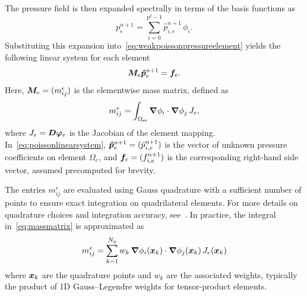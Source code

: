 \documentclass[../main.tex]{subfiles}
\begin{document}
The pressure field is then expanded spectrally in terms of the basis functions as
\begin{equation}
p_e^{n+1} = \sum_{i=0}^{p^2-1} \hat{p}_{i,e}^{n+1} \, \phi_i .
\end{equation}
Substituting this expansion into~\eqref{eq:weakpoissonpressureelement} yields the following linear system for each element
\begin{equation}
	\bm{M}_e \bm{\hat{p}}_e^{n+1} = \bm{f}_e.
	\label{eq:poissonlinearsystem}
\end{equation}
Here, $\bm{M}_e = (m_{ij}^e)$ is the elementwise mass matrix, defined as
\begin{equation}
	m_{ij}^e = \int_{\Omega_\text{st}} \grad \phi_{i} \cdot \grad \phi_{j} \, J_e,
	\label{eq:massmatrix}
\end{equation}
where $J_e = \bm{D\varphi}_e$ is the Jacobian of the element mapping. In~\eqref{eq:poissonlinearsystem}, $\bm{\hat{p}}_e^{n+1} = (\hat{p}_{i,e}^{n+1})$ is the vector of unknown pressure coefficients on element $\Omega_e$, and $\bm{f}_e = (f_{i,e}^{n+1})$ is the corresponding right-hand side vector, assumed precomputed for brevity.

The entries $m_{ij}^e$ are evaluated using Gauss quadrature with a sufficient number of points to ensure exact integration on quadrilateral elements. For more details on quadrature choices and integration accuracy, see~\cite{spectralhpSpencerBible}. In practice, the integral in~\eqref{eq:massmatrix} is approximated as
\begin{equation}
	m_{ij}^e = \sum_{k=1}^{N_q} w_k \, \grad \phi_{i}(\bm{x}_k) \cdot \grad \phi_{j}(\bm{x}_k) \, J_e(\bm{x}_k)
	\label{eq:massmatrixgauss}
\end{equation}
where $\bm{x}_k$ are the quadrature points and $w_k$ are the associated weights, typically the product of 1D Gauss–Legendre weights for tensor-product elements.
\end{document}
